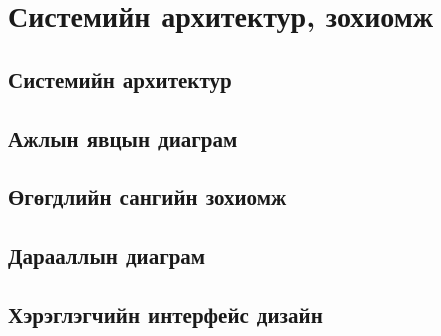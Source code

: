 \chapter{Системийн архитектур, зохиомж}

\section{Системийн архитектур}
\section{Ажлын явцын диаграм}
\section{Өгөгдлийн сангийн зохиомж}
\section{Дарааллын диаграм}
\section{Хэрэглэгчийн интерфейс дизайн}


